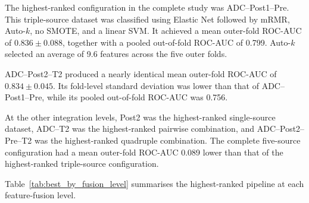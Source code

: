 \documentclass[12pt,twocolumn]{article}
\begin{document}
The highest-ranked configuration in the complete study was
ADC--Post1--Pre. This triple-source dataset was classified using
Elastic Net followed by mRMR, Auto-\(k\), no SMOTE, and a linear SVM.
It achieved a mean outer-fold ROC-AUC of
\(0.836 \pm 0.088\), together with a pooled out-of-fold ROC-AUC of
0.799. Auto-\(k\) selected an average of 9.6 features across the five
outer folds.






ADC--Post2--T2 produced a nearly identical mean outer-fold ROC-AUC of
\(0.834 \pm 0.045\). Its fold-level standard deviation was lower than
that of ADC--Post1--Pre, while its pooled out-of-fold ROC-AUC was
0.756.

At the other integration levels, Post2 was the highest-ranked
single-source dataset, ADC--T2 was the highest-ranked pairwise
combination, and ADC--Post2--Pre--T2 was the highest-ranked
quadruple combination. The complete five-source configuration had a
mean outer-fold ROC-AUC 0.089 lower than that of the highest-ranked
triple-source configuration.

Table~\ref{tab:best_by_fusion_level} summarises the highest-ranked
pipeline at each feature-fusion level.
\end{document}
